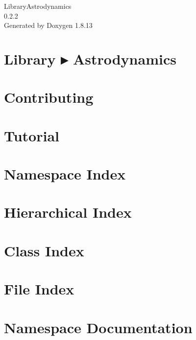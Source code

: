 \documentclass[twoside]{book}
\newcommand{\+}{\discretionary{\mbox{\scriptsize$\hookleftarrow$}}{}{}}
\newcommand{\clearemptydoublepage}{%
  \newpage{\pagestyle{empty}\cleardoublepage}%
}
\begin{document}
\hypersetup{pageanchor=false,
             bookmarksnumbered=true,
             pdfencoding=unicode
            }
\begin{titlepage}
\vspace*{7cm}
\begin{center}%
{\Large Library\+Astrodynamics \\[1ex]\large 0.\+2.\+2 }\\
\vspace*{1cm}
{\large Generated by Doxygen 1.8.13}\\
\end{center}
\end{titlepage}
\clearemptydoublepage
{}
\tableofcontents
\clearemptydoublepage
{}
\hypersetup{pageanchor=true}

\chapter{Library ▸ Astrodynamics}
\label{index}\hypertarget{index}{}
\chapter{Contributing}
\label{md__c_o_n_t_r_i_b_u_t_i_n_g}

\chapter{Tutorial}
\label{md_docs__tutorial}

\chapter{Namespace Index}

\chapter{Hierarchical Index}

\chapter{Class Index}

\chapter{File Index}

\chapter{Namespace Documentation}











\end{document}
